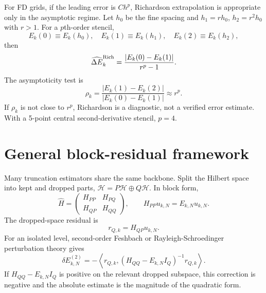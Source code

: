 \documentclass[11pt,a4paper]{article}
\newcommand{\abs}[1]{\left|#1\right|}
\newcommand{\Hhat}{\widehat H}
\newcommand{\errhat}{\widehat{\Delta E}}
\begin{document}
For FD grids, if the leading error is $C h^p$, Richardson extrapolation is appropriate only in the asymptotic regime.  Let $h_0$ be the fine spacing and $h_1=rh_0$, $h_2=r^2h_0$ with $r>1$.  For a $p$th-order stencil,
\begin{equation}
  E_k(0)\equiv E_k(h_0),\quad E_k(1)\equiv E_k(h_1),\quad E_k(2)\equiv E_k(h_2),
\end{equation}
then
\begin{equation}
  \errhat_k^{\rm Rich}=\frac{\abs{E_k(0)-E_k(1)}}{r^p-1}.
\end{equation}
The asymptoticity test is
\begin{equation}
  \rho_k=\frac{\abs{E_k(1)-E_k(2)}}{\abs{E_k(0)-E_k(1)}}\approx r^p.
\end{equation}
If $\rho_k$ is not close to $r^p$, Richardson is a diagnostic, not a verified error estimate.  With a 5-point central second-derivative stencil, $p=4$.

\section{General block-residual framework}
\label{sec:block}

Many truncation estimators share the same backbone.  Split the Hilbert space into kept and dropped parts, $\mathcal H=P\mathcal H\oplus Q\mathcal H$.  In block form,
\begin{equation}
  \Hhat=\begin{pmatrix}H_{PP}&H_{PQ}\\H_{QP}&H_{QQ}\end{pmatrix},\qquad H_{PP}u_{k,N}=E_{k,N}u_{k,N}.
\end{equation}
The dropped-space residual is
\begin{equation}
  r_{Q,k}=H_{QP}u_{k,N}.
\end{equation}
For an isolated level, second-order Feshbach or Rayleigh-Schroedinger perturbation theory gives
\begin{equation}
  \delta E^{(2)}_{k,N}=-\left\langle r_{Q,k},(H_{QQ}-E_{k,N}I_Q)^{-1}r_{Q,k}\right\rangle.
\end{equation}
If $H_{QQ}-E_{k,N}I_Q$ is positive on the relevant dropped subspace, this correction is negative and the absolute estimate is the magnitude of the quadratic form.
\end{document}

